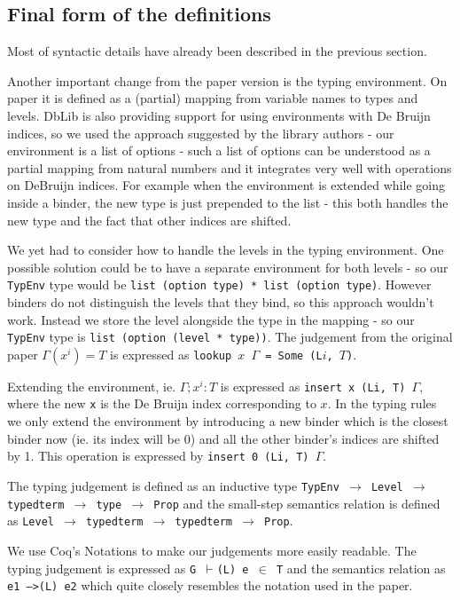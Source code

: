 \documentclass[runningheads]{article}
\begin{document}
\subsection{Final form of the definitions}
\label{finalformencoding}
Most of syntactic details have already been described in the previous section.

Another important change from the paper version is the typing environment. On paper it is defined as a (partial) mapping from variable names to types and levels.
DbLib is also providing support for using environments with De Bruijn indices, so we used the approach suggested by the library authors - our environment is a list of options - such a list of options can be understood as a partial mapping from natural numbers and it integrates very well with operations on DeBruijn indices. For example when the environment is extended while going inside a binder, the new type is just prepended to the list - this both handles the new type and the fact that other indices are shifted.

We yet had to consider how to handle the levels in the typing environment. One possible solution could be to have a separate environment for both levels - so our \texttt{TypEnv} type would be \texttt{list (option type) * list (option type)}. However binders do not distinguish the levels that they bind, so this approach wouldn't work. Instead we store the level alongside the type in the mapping - so our \texttt{TypEnv} type is \texttt{list (option (level * type))}. The judgement from the original paper $\Gamma(x^i) = T$ is expressed as \texttt{lookup $x$ $\Gamma$ = Some (L$i$, $T$)}.

Extending the environment, ie. $\Gamma; x^i : T$ is expressed as \verb|insert x (Li, T) |$\Gamma$, where the new \verb|x| is the De Bruijn index corresponding to $x$. In the typing rules we only extend the environment by introducing a new binder which is the closest binder now (ie. its index will be 0) and all the other binder's indices are shifted by 1. This operation is expressed by \verb|insert 0 (Li, T) |$\Gamma$.

The typing judgement is defined as an inductive type \texttt{TypEnv $\to$ Level $\to$ typedterm $\to$ type $\to$ Prop} and the small-step semantics relation is defined as \texttt{Level $\to$ typedterm $\to$ typedterm $\to$ Prop}. 

We use Coq's Notations to make our judgements more easily readable. The typing judgement is expressed as \texttt{G $\vdash$(L) e $\in$ T} and the semantics relation as \texttt{e1 -->(L) e2} which quite closely resembles the notation used in the paper.
\end{document}
